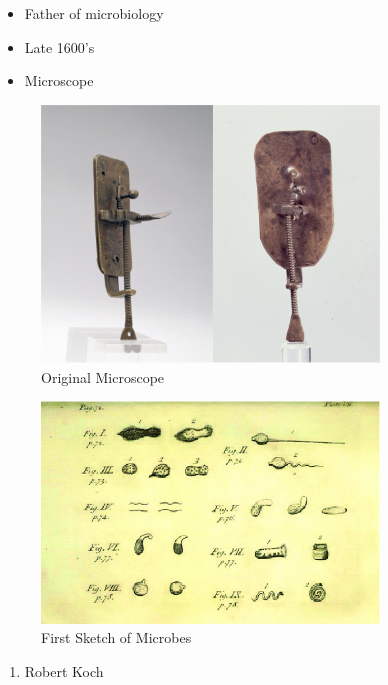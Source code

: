 \documentclass[
]{book}
\providecommand{\tightlist}{%
  \setlength{\itemsep}{0pt}\setlength{\parskip}{0pt}}
\begin{document}
\begin{itemize}
\tightlist
\item
  Father of microbiology
\item
  Late 1600's
\item
  Microscope
\end{itemize}

\begin{figure}
\centering
\includegraphics[width=0.8\textwidth,height=\textheight]{./Figures/Microscope.png}
\caption{Original Microscope}
\end{figure}

\begin{figure}
\centering
\includegraphics[width=0.8\textwidth,height=\textheight]{./Figures/leeuwenhoeck.png}
\caption{First Sketch of Microbes}
\end{figure}

\begin{enumerate}
\def\labelenumi{\arabic{enumi}.}
\setcounter{enumi}{1}
\tightlist
\item
  Robert Koch
\end{enumerate}
\end{document}
